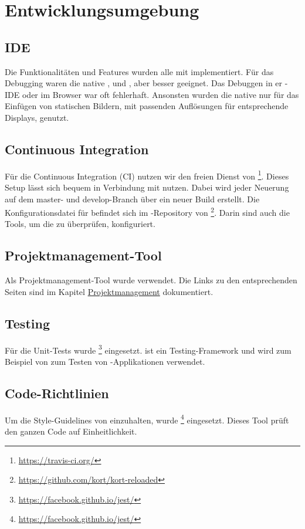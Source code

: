 \chapter{Entwicklungsumgebung}
\label{pd-entwicklungsumgebung}


\section{IDE}
Die Funktionalitäten und Features wurden alle mit  implementiert. 
Für das Debugging waren die native ,  und , aber besser geeignet. 
Das Debuggen in er -\gls{IDE} oder im  Browser war oft fehlerhaft. 
Ansonsten wurden die native  nur für das Einfügen von statischen Bildern, mit passenden Auflösungen für entsprechende Displays, genutzt. 


\section{Continuous Integration}
Für die Continuous Integration (\gls{CI}) nutzen wir den freien Dienst von \footnote{\url{https://travis-ci.org/}}.
Dieses Setup lässt sich bequem in Verbindung mit  nutzen. 
Dabei wird jeder Neuerung auf dem master- und develop-Branch über  ein neuer Build erstellt. 
Die Konfigurationsdatei für  befindet sich im -Repository von \kort{}\footnote{\url{https://github.com/kort/kort-reloaded}}. 
Darin sind auch die Tools, um die  zu überprüfen, konfiguriert. 


\section{Projektmanagement-Tool}
Als Projektmanagement-Tool wurde  verwendet. 
Die Links zu den entsprechenden Seiten sind im Kapitel \hyperref[pm-projektmanagement]{Projektmanagement} dokumentiert.


\section{Testing}
Für die Unit-Tests wurde \footnote{\url{https://facebook.github.io/jest/}} eingesetzt. 
 ist ein  Testing-\gls{Framework} und wird zum Beispiel von  zum Testen von -Applikationen verwendet. 


\section{Code-Richtlinien}
\label{pd-entwicklungsumgebung-cr}

Um die Style-Guidelines von  einzuhalten, wurde \footnote{\url{https://facebook.github.io/jest/}} eingesetzt. 
Dieses Tool prüft den ganzen Code auf Einheitlichkeit. 

